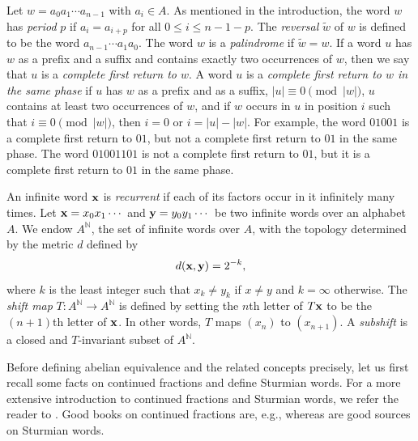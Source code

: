 \documentclass[a4paper,fleqn]{article}
\providecommand{\abs}[1]{\lvert#1\rvert}
\newcommand{\infw}[1]{%
  \ifcat\noexpand#1\relax\bm{#1}%
  \else\mathbf{#1}\fi}          %
\newcommand{\mirror}[1]{\widetilde{#1}}
\newcommand{\N}{\mathbb{N}}
\begin{document}
  Let $w = a_0 a_1 \dotsm a_{n-1}$ with $a_i \in A$. As mentioned in the introduction, the word $w$ has \emph{period}
  $p$ if $a_i = a_{i+p}$ for all $0 \leq i \leq n - 1 - p$. The \emph{reversal} $\mirror{w}$ of $w$ is defined to be
  the word $a_{n-1} \dotsm a_1 a_0$. The word $w$ is a \emph{palindrome} if $\mirror{w} = w$. If a word $u$ has $w$ as
  a prefix and a suffix and contains exactly two occurrences of $w$, then we say that $u$ is a \emph{complete first
  return to $w$}. A word $u$ is a \emph{complete first return to $w$ in the same phase} if $u$ has $w$ as a prefix and
  as a suffix, $\abs{u} \equiv 0 \pmod{\abs{w}}$, $u$ contains at least two occurrences of $w$, and if $w$ occurs in
  $u$ in position $i$ such that $i \equiv 0 \pmod{\abs{w}}$, then $i = 0$ or $i = \abs{u} - \abs{w}$. For example, the
  word $01001$ is a complete first return to $01$, but not a complete first return to $01$ in the same phase. The word
  $01001101$ is not a complete first return to $01$, but it is a complete first return to $01$ in the same phase.

  An infinite word $\infw{x}$ is \emph{recurrent} if each of its factors occur in it infinitely many times. Let
  $\infw{x} = x_0 x_1 \dotsm$ and $\infw{y} = y_0 y_1 \dotsm$ be two infinite words over an alphabet $A$. We endow
  $A^\N$, the set of infinite words over $A$, with the topology determined by the metric $d$ defined by
  \begin{equation*}
    d(\infw{x}, \infw{y}) = 2^{-k},
  \end{equation*}
  where $k$ is the least integer such that $x_k \neq y_k$ if $x \neq y$ and $k = \infty$ otherwise. The \emph{shift
  map} $T\colon A^\N \to A^\N$ is defined by setting the $n$th letter of $T\infw{x}$ to be the $(n+1)$th letter of
  $\infw{x}$. In other words, $T$ maps $(x_n)$ to $(x_{n+1})$. A \emph{subshift} is a closed and $T$-invariant subset
  of $A^\N$.
  
  Before defining abelian equivalence and the related concepts precisely, let us first recall some facts on continued
  fractions and define Sturmian words. For a more extensive introduction to continued fractions and Sturmian words, we
  refer the reader to \cite[Ch.~4]{diss:jarkko_peltomaki}. Good books on continued fractions are, e.g.,
  \cite{1979:an_introduction_to_the_theory_of_numbers,1997:continued_fractions} whereas
  \cite{2002:algebraic_combinatorics_on_words,2002:substitutions_in_dynamics_arithmetics_and_combinatorics} are good
  sources on Sturmian words.
\end{document}
